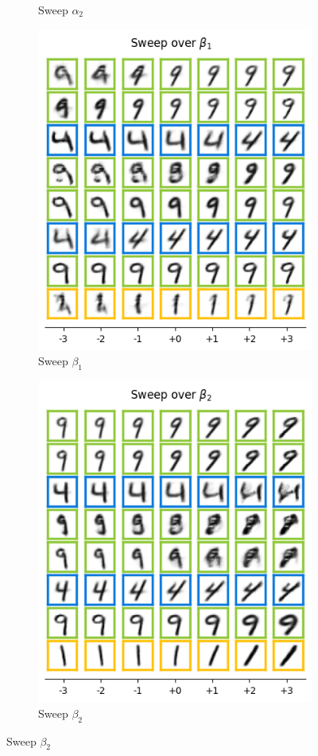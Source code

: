 \begin{figure}[h]
\begin{subfigure}[t]{.23\linewidth}
		\caption{Sweep $\alpha_2$}
	\end{subfigure}
	\begin{subfigure}[t]{.23\linewidth}
		\includegraphics[width=.9\textwidth]{../openreview/pictures/Figure13/beta_1.png}
		\caption{Sweep $\beta_1$}
	\end{subfigure}
	\begin{subfigure}[t]{.23\linewidth}
		\includegraphics[width=.9\textwidth]{../openreview/pictures/Figure13/beta_2.png}
		\caption{Sweep $\beta_2$}
	\end{subfigure}
	

\end{figure}
